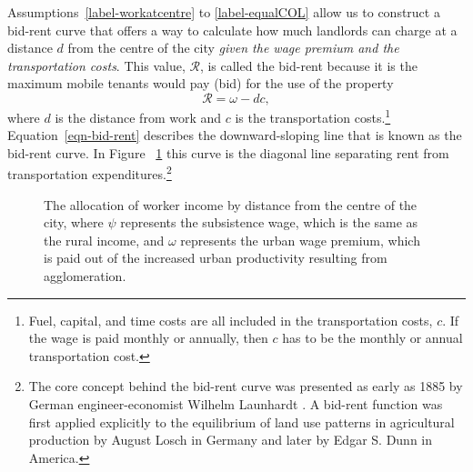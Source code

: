 Assumptions~\ref{label-workatcentre}  to \ref{label-equalCOL} allow us to construct a \gls{bid-rent curve} that offers a way to calculate how much landlords can charge at a distance $d$ from the centre of the city \emph{given the wage premium and the transportation costs}. This value, $\mathcal{R}$, is called the bid-rent because it is the maximum mobile tenants would pay (bid) for the use of the property
\begin{equation}  
\mathcal{R}= \omega - dc, \label{eqn-bid-rent}\end{equation} 
where $d$ is the distance from work and $c$ is the transportation costs.\footnote{Fuel, capital, and time costs are all included in the transportation costs, ${c}$.  If the wage is paid monthly or annually, then $c$ has to be the monthly or annual transportation cost.} Equation~\ref{eqn-bid-rent} describes the downward-sloping line that is known as the bid-rent curve. In Figure ~\ref{fig-alonso-simple} this curve is the diagonal line separating rent from transportation expenditures.\footnote{The core concept behind the bid-rent curve was presented as early as 1885  by German engineer-economist Wilhelm Launhardt \cite{blaugEconomicTheoryRetrospect1985, launhardtMathematischeBegruendungVolkswirthschaftslehre1885}. A \gls{bid-rent function} was first applied explicitly to the equilibrium of land use patterns in agricultural production by August Losch \cite{loschEconomicsLocation1954} in Germany and later by Edgar S. Dunn \cite{dunnEquilibriumLandUsePatterns1954} in America. }

\begin{figure}[!ht]
    \begin{center}
    
    \caption[The allocation of worker income by distance from the centre of the city.]{The allocation of worker income by distance from the centre of the city, where $\psi$ represents the \gls{subsistence wage}, which is the same as the rural income, and $\omega$ represents the \gls{urban wage premium}, which is paid out of the increased urban productivity resulting from agglomeration.}
    \label{fig-alonso-simple}
    \end{center}
\end{figure}

